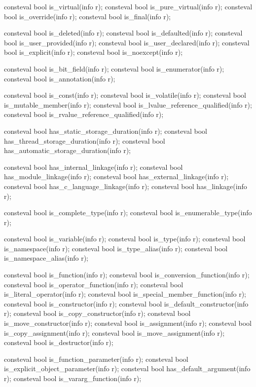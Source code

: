 \begin{codeblock}
{  consteval bool is_virtual(info r);
  consteval bool is_pure_virtual(info r);
  consteval bool is_override(info r);
  consteval bool is_final(info r);

  consteval bool is_deleted(info r);
  consteval bool is_defaulted(info r);
  consteval bool is_user_provided(info r);
  consteval bool is_user_declared(info r);
  consteval bool is_explicit(info r);
  consteval bool is_noexcept(info r);

  consteval bool is_bit_field(info r);
  consteval bool is_enumerator(info r);
  consteval bool is_annotation(info r);

  consteval bool is_const(info r);
  consteval bool is_volatile(info r);
  consteval bool is_mutable_member(info r);
  consteval bool is_lvalue_reference_qualified(info r);
  consteval bool is_rvalue_reference_qualified(info r);

  consteval bool has_static_storage_duration(info r);
  consteval bool has_thread_storage_duration(info r);
  consteval bool has_automatic_storage_duration(info r);

  consteval bool has_internal_linkage(info r);
  consteval bool has_module_linkage(info r);
  consteval bool has_external_linkage(info r);
  consteval bool has_c_language_linkage(info r);
  consteval bool has_linkage(info r);

  consteval bool is_complete_type(info r);
  consteval bool is_enumerable_type(info r);

  consteval bool is_variable(info r);
  consteval bool is_type(info r);
  consteval bool is_namespace(info r);
  consteval bool is_type_alias(info r);
  consteval bool is_namespace_alias(info r);

  consteval bool is_function(info r);
  consteval bool is_conversion_function(info r);
  consteval bool is_operator_function(info r);
  consteval bool is_literal_operator(info r);
  consteval bool is_special_member_function(info r);
  consteval bool is_constructor(info r);
  consteval bool is_default_constructor(info r);
  consteval bool is_copy_constructor(info r);
  consteval bool is_move_constructor(info r);
  consteval bool is_assignment(info r);
  consteval bool is_copy_assignment(info r);
  consteval bool is_move_assignment(info r);
  consteval bool is_destructor(info r);

  consteval bool is_function_parameter(info r);
  consteval bool is_explicit_object_parameter(info r);
  consteval bool has_default_argument(info r);
  consteval bool is_vararg_function(info r);

}
\end{codeblock}

